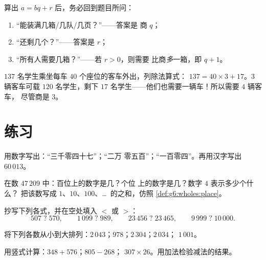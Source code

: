 \begin{method}[含除法的应用题]\label{met:g6:wholes:problems}
算出 $a = bq + r$ 后，务必回到题目所问：
\begin{enumerate}
  \item “能装满几箱/几队/几页？”——答案是
        商 $q$；
  \item “还剩几个？”——答案是
         $r$；
  \item “所有人需要几箱？”——若 $r > 0$，则需要
        比商\emph{多}一箱，即 $q + 1$。
\end{enumerate}
\end{method}

\begin{example}\label{ex:g6:wholes:bus}
$137$ 名学生乘坐每车 $40$ 个座位的客车外出，列除法算式：
$137 = 40 \times 3 + 17$。3 辆客车可载 $120$ 名学生，剩下 $17$
名学生——他们也需要一辆车！所以需要 $4$ 辆客车，
尽管商是 $3$。
\end{example}

\section{练习}

\begin{exercise}[$\star$]\label{exo:g6:wholes:1}
用数字写出：“三千零四十七”；“二万
零五百”；“一百零四”。再用汉字写出 $60\,013$。
\end{exercise}

\begin{exercise}[$\star$]\label{exo:g6:wholes:2}
在数 $47\,209$ 中：百位上的数字是几？个位
上的数字是几？数字 $4$ 表示多少个什么？
把该数写成 $1$、$10$、$100$、\dots\ 的之和，仿照
\cref{def:g6:wholes:place}。
\end{exercise}

\begin{exercise}[$\star$]\label{exo:g6:wholes:3}
抄写下列各式，并在空处填入 $<$ 或 $>$：
\[
507 \;?\; 570, \qquad
1\,099 \;?\; 989, \qquad
23\,456 \;?\; 23\,465, \qquad
9\,999 \;?\; 10\,000 .
\]
\end{exercise}

\begin{exercise}[$\star$]\label{exo:g6:wholes:4}
将下列各数从小到大排列：$2\,043$；$978$；$2\,304$；$2\,034$；
$1\,001$。
\end{exercise}

\begin{exercise}[$\star$]\label{exo:g6:wholes:5}
用竖式计算：$348 + 576$；\quad $805 - 268$；\quad
$307 \times 26$。用加法检验减法的结果。
\end{exercise}

